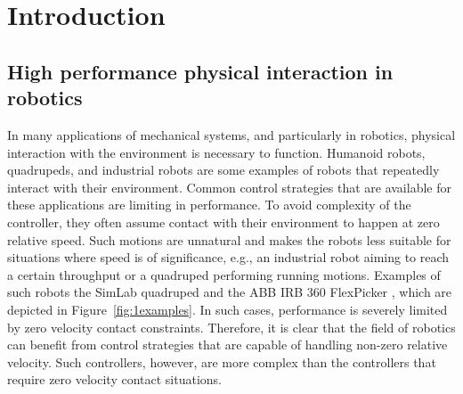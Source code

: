 \documentclass[../DC2019003Bouma.tex]{subfiles}
\begin{document}
\graphicspath{{01_Introduction/img/}}
\renewcommand{\chaptermark}[1]{\markboth{\thechapter.\ #1}{}}
\renewcommand{\sectionmark}[1]{\markright{#1}{}}
\cleartooddpage
\pagestyle{fancyreport}

\chapter{Introduction}\label{ch:intro}
\section{High performance physical interaction in robotics}
In many applications of mechanical systems, and particularly in robotics, physical interaction with the environment is necessary to function. Humanoid robots, quadrupeds, and industrial robots are some examples of robots that repeatedly interact with their environment. Common control strategies that are available for these applications are limiting in performance. To avoid complexity of the controller, they often assume contact with their environment to happen at zero relative speed. Such motions are unnatural and makes the robots less suitable for situations where speed is of significance, e.g., an industrial robot aiming to reach a certain throughput or a quadruped performing running motions. Examples of such robots the SimLab quadruped \cite{VTquad} and the ABB IRB 360 FlexPicker \cite{Flexpicker}, which are depicted in Figure~\ref{fig:1examples}. In such cases, performance is severely limited by zero velocity contact constraints. Therefore, it is clear that the field of robotics can benefit from control strategies that are capable of handling non-zero relative velocity. Such controllers, however, are more complex than the controllers that require zero velocity contact situations.
\end{document}
